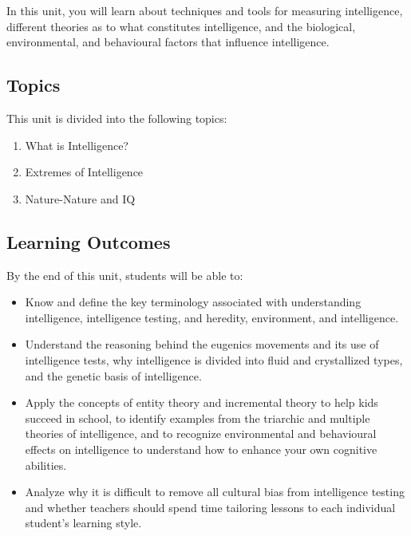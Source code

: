\documentclass[
]{book}
\providecommand{\tightlist}{%
  \setlength{\itemsep}{0pt}\setlength{\parskip}{0pt}}
\begin{document}
In this unit, you will learn about techniques and tools for measuring intelligence, different theories as to what constitutes intelligence, and the biological, environmental, and behavioural factors that influence intelligence.

\hypertarget{topics-1}{%
\subsection*{Topics}\label{topics-1}}

This unit is divided into the following topics:

\begin{enumerate}
\def\labelenumi{\arabic{enumi}.}
\tightlist
\item
  What is Intelligence?\\
\item
  Extremes of Intelligence\\
\item
  Nature-Nature and IQ
\end{enumerate}

\hypertarget{learning-outcomes-1}{%
\subsection*{Learning Outcomes}\label{learning-outcomes-1}}

By the end of this unit, students will be able to:

\begin{itemize}
\tightlist
\item
  Know and define the key terminology associated with understanding intelligence, intelligence testing, and heredity, environment, and intelligence.\\
\item
  Understand the reasoning behind the eugenics movements and its use of intelligence tests, why intelligence is divided into fluid and crystallized types, and the genetic basis of intelligence.\\
\item
  Apply the concepts of entity theory and incremental theory to help kids succeed in school, to identify examples from the triarchic and multiple theories of intelligence, and to recognize environmental and behavioural effects on intelligence to understand how to enhance your own cognitive abilities.\\
\item
  Analyze why it is difficult to remove all cultural bias from intelligence testing and whether teachers should spend time tailoring lessons to each individual student's learning style.
\end{itemize}
\end{document}
